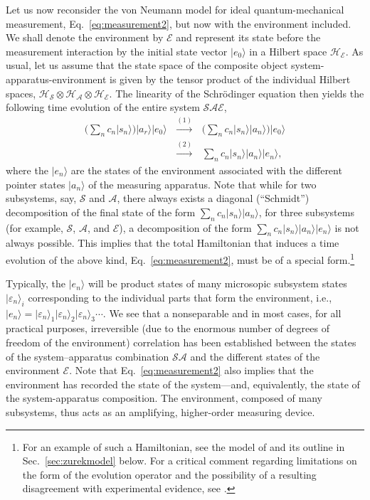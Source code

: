 \documentclass[twocolumn,rmp,aps,amsmath,amsfonts,noshowkeys,noshowpacs]{revtex4}
\newcommand{\ket}[1]{\ensuremath{|{#1\rangle}}}
\begin{document}
Let us now reconsider the von Neumann model for ideal
quantum-mechanical measurement, Eq.~\eqref{eq:measurement2}, but now
with the environment included. We shall denote the environment by
$\mathcal{E}$ and represent its state before the measurement
interaction by the initial state vector $\ket{e_0}$ in a Hilbert space
$\mathcal{H}_{\mathcal{E}}$. As usual, let us assume that the state
space of the composite object system-apparatus-environment is given
by the tensor product of the individual Hilbert spaces,
$\mathcal{H}_{\mathcal{S}} \otimes \mathcal{H}_{\mathcal{A}} \otimes
\mathcal{H}_{\mathcal{E}}$. The linearity of the Schr\"odinger
equation then yields the following time evolution of the entire system
$\mathcal{SAE}$,
%
\begin{eqnarray} \label{eq:measurement2} 
\bigg( \sum_n c_n \ket{s_n}
\bigg) \ket{a_r}\ket{e_0} 
\, &\stackrel{(1)}{\longrightarrow}& \, \bigg( \sum_n c_n
\ket{s_n} \ket{a_n} \bigg) \ket{e_0} \nonumber \\
\, & \stackrel{(2)}{\longrightarrow} & \, \sum_n c_n \ket{s_n}
\ket{a_n} \ket{e_n}, 
\end{eqnarray}
%
where the $\ket{e_n}$ are the states of the environment associated
with the different pointer states $\ket{a_n}$ of the measuring
apparatus. Note that while for two subsystems, say, $\mathcal{S}$ and
$\mathcal{A}$, there always exists a diagonal (``Schmidt'')
decomposition of the final state of the form $\sum_n c_n \ket{s_n}
\ket{a_n}$, for three subsystems (for example, $\mathcal{S}$,
$\mathcal{A}$, and $\mathcal{E}$), a decomposition of the form $\sum_n
c_n \ket{s_n} \ket{a_n} \ket{e_n}$ is not always possible. This
implies that the total Hamiltonian that induces a time evolution of
the above kind, Eq.~\eqref{eq:measurement2}, must be of a special
form.\footnote{For an example of such a Hamiltonian, see the model of
  \citet{Zurek:1981:dd,Zurek:1982:tv} and its outline in
  Sec.~\ref{sec:zurekmodel} below. For a critical comment regarding
  limitations on the form of the evolution operator and the
  possibility of a resulting disagreement with experimental evidence,
  see \citet{Pessoa:1998:yl}.}

Typically, the $\ket{e_n}$ will be product states of many microsopic
subsystem states $\ket{\varepsilon_n}_i$ corresponding to the
individual parts that form the environment, i.e.,
$\ket{e_n}=\ket{\varepsilon_n}_1 \ket{\varepsilon_n}_2
\ket{\varepsilon_n}_3 \cdots$. We see that a nonseparable and in most
cases, for all practical purposes, irreversible (due to the enormous
number of degrees of freedom of the environment) correlation has been
established between the states of the system--apparatus combination
$\mathcal{SA}$ and the different states of the environment
$\mathcal{E}$. Note that Eq.~\eqref{eq:measurement2} also implies that
the environment has recorded the state of the system---and,
equivalently, the state of the system-apparatus composition. The
environment, composed of many subsystems, thus acts as an amplifying,
higher-order measuring device.
\end{document}
